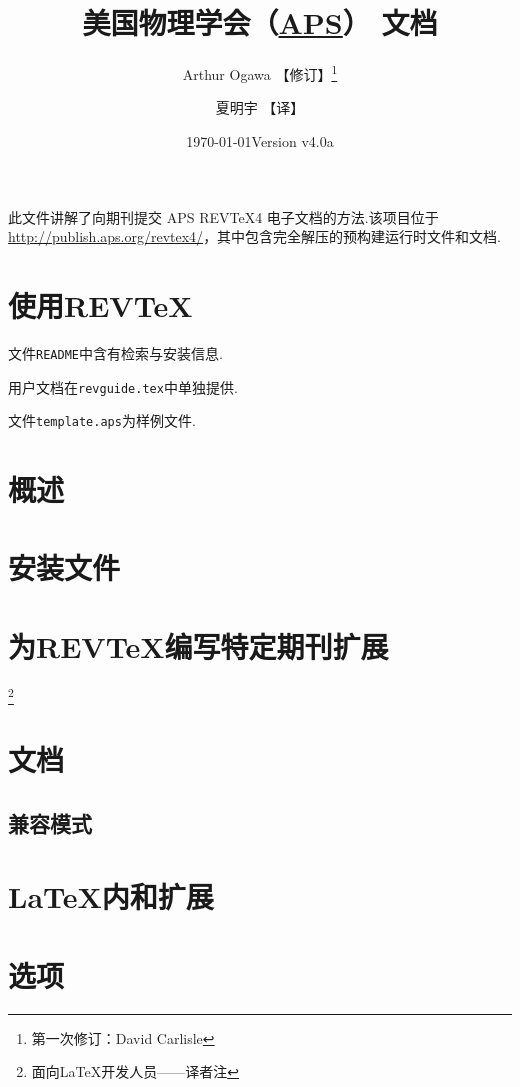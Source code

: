 \documentclass[10pt]{ltxdoc}
\title{美国物理学会（\href{https://www.aps.org/}{APS}） \pkg{revtex4} 文档}
\author[1]{Arthur Ogawa 【修订】\footnote{第一次修订：David Carlisle}}
\author[2]{夏明宇 【译】}
\affil[1]{\href{mailto:xiamyphys@gmail.com}{\texttt{xiamyphys@gmail.com}}}
\date{\today\quad Version v4.0a}
\begin{document}
\maketitle

此文件讲解了向期刊提交 APS REV\TeX 4 电子文档的方法.该项目位于 \href{http://publish.aps.org/revtex4/}{http://publish.aps.org/revtex4/}，其中包含完全解压的预构建运行时文件和文档.


\tableofcontents

\section{使用REV\TeX}

文件\texttt{README}中含有检索与安装信息. 

用户文档在\texttt{revguide.tex}中单独提供. 

文件\texttt{template.aps}为样例文件.

\section{概述}

\section{安装文件}

\section{为REV\TeX 编写特定期刊扩展}\footnote{面向\LaTeX 开发人员——译者注}

\section{文档}
\subsection{兼容模式}

\section{\LaTeX 内和扩展}

\section{选项}
\end{document}

